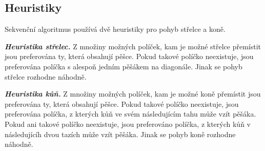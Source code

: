 \documentclass{article}
\newcommand{\heuristika}[1]{\textbf{\textit{Heuristika {#1}.}}}
\begin{document}
    \label{subsec:seq-heuristics}

    \subsection{Heuristiky}

    Sekvenční algoritmus používá dvě heuristiky pro pohyb střelce a koně.

    \heuristika{střelec} Z množiny možných políček, kam je možné střelce přemístit jsou preferována ty,
    která obsahují pěšce. Pokud takové políčko neexistuje, jsou preferována políčka s alespoň jedním pěšákem
    na diagonále. Jinak se pohyb střelce rozhodne náhodně.
    \hspace{1.5pt}

    \heuristika{kůň} Z množiny možných políček, kam je možné koně přemístit jsou preferována ty,
    která obsahují pěšce. Pokud takové políčko neexistuje, jsou preferována políčka, z kterých
    kůň ve svém následujícím tahu může vzít pěšáka. Pokud ani takové políčko neexistuje, jsou
    preferováno políčka, z kterých kůň v následujícíh dvou tazích může vzít pěšáka.
    Jinak se pohyb koně rozhodne náhodně.
\end{document}

